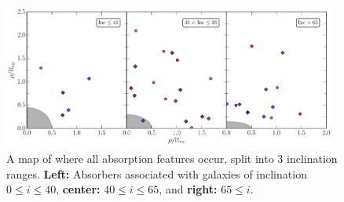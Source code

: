 \documentclass[iop]{emulateapj-rtx4}
\begin{document}
%
% 

\begin{figure}[ht!]
        \centering
        \includegraphics[width=0.98\textwidth]{azimuthMap_horizontal.pdf}
        \caption{\small{A map of where all absorption features occur, split into 3 inclination ranges. \textbf{Left:} Absorbers associated with galaxies of inclination $0 \leq i \le 40$, \textbf{center:} $40 \leq i \le 65$, and \textbf{right: } $65 \leq i$.}}
        \label{azimuthMap}
        \vspace{5pt}
\end{figure} 
\end{document}
